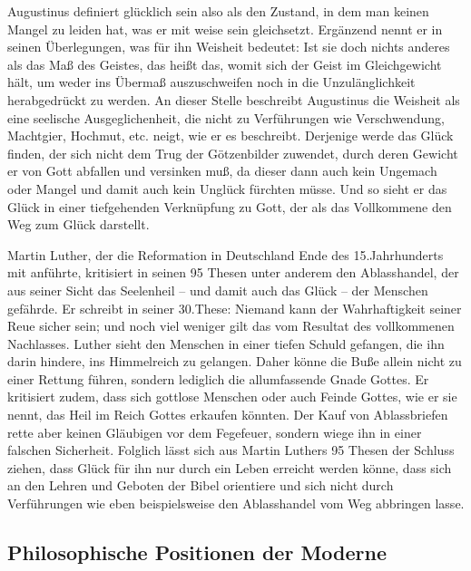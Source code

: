 Augustinus definiert \glqq glücklich sein\grqq{} also als den Zustand, in dem man keinen Mangel zu leiden hat, was er mit \glqq weise sein\grqq{} gleichsetzt. 
Ergänzend nennt er in seinen Überlegungen, was für ihn Weisheit bedeutet: \glqq Ist sie doch nichts anderes als das Maß des Geistes, das heißt das, womit sich der Geist im Gleichgewicht hält, um weder ins Übermaß auszuschweifen noch in die Unzulänglichkeit herabgedrückt zu werden.\grqq{}\cite[S.\,59]{A82} 
An dieser Stelle beschreibt Augustinus die Weisheit als eine seelische Ausgeglichenheit, die nicht zu Verführungen wie Verschwendung, Machtgier, Hochmut, etc. neigt, wie er es beschreibt. 
Derjenige werde das Glück finden, der sich nicht \glqq dem Trug der Götzenbilder zuwendet, durch deren Gewicht er von Gott abfallen und versinken muß\grqq{}, da dieser dann auch kein Ungemach oder Mangel und damit auch kein Unglück fürchten müsse. 
Und so sieht er das Glück in einer tiefgehenden Verknüpfung zu Gott, der als das Vollkommene den Weg zum Glück darstellt.

Martin Luther, der die Reformation in Deutschland Ende des 15.Jahrhunderts mit anführte, kritisiert in seinen 95 Thesen unter anderem den Ablasshandel, der aus seiner Sicht das Seelenheil -- und damit auch das Glück -- der Menschen gefährde. 
Er schreibt in seiner 30.These: \glqq Niemand kann der Wahrhaftigkeit seiner Reue sicher sein; und noch viel weniger gilt das vom Resultat des vollkommenen Nachlasses.\grqq{}\cite[S.\,56]{ML65}
Luther sieht den Menschen in einer tiefen Schuld gefangen, die ihn darin hindere, ins Himmelreich zu gelangen. 
Daher könne die Buße allein nicht zu einer Rettung führen, sondern lediglich die allumfassende Gnade Gottes. 
Er kritisiert zudem, dass sich gottlose Menschen oder auch Feinde Gottes, wie er sie nennt, das Heil im Reich Gottes erkaufen könnten. 
Der Kauf von Ablassbriefen rette aber keinen Gläubigen vor dem Fegefeuer, sondern wiege ihn in einer falschen Sicherheit\cite[S.\,58]{ML65}.
Folglich lässt sich aus Martin Luthers 95 Thesen der Schluss ziehen, dass Glück für ihn nur durch ein Leben erreicht werden könne, dass sich an den Lehren und Geboten der Bibel orientiere und sich nicht durch Verführungen wie eben beispielsweise den Ablasshandel vom Weg abbringen lasse.


\newpage

\subsection{Philosophische Positionen der Moderne}

